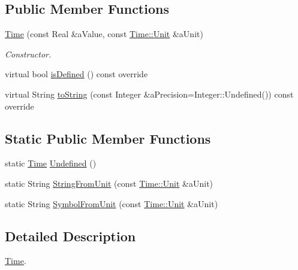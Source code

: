 \subsection*{Public Member Functions}
\begin{DoxyCompactItemize}
\item 
\hyperlink{classlibrary_1_1physics_1_1units_1_1_time_a60e2228b16ea9156a4c5ede4d7b141e5}{Time} (const Real \&a\+Value, const \hyperlink{classlibrary_1_1physics_1_1units_1_1_time_ab876a6a05c9a2f28905f2753bfd64109}{Time\+::\+Unit} \&a\+Unit)
\begin{DoxyCompactList}\small\item\em Constructor. \end{DoxyCompactList}\item 
virtual bool \hyperlink{classlibrary_1_1physics_1_1units_1_1_time_ab62163386c3253277c5ba71782261cad}{is\+Defined} () const override
\item 
virtual String \hyperlink{classlibrary_1_1physics_1_1units_1_1_time_a6f56977493a45d334bb53bc4246888c4}{to\+String} (const Integer \&a\+Precision=Integer\+::\+Undefined()) const override
\end{DoxyCompactItemize}
\subsection*{Static Public Member Functions}
\begin{DoxyCompactItemize}
\item 
static \hyperlink{classlibrary_1_1physics_1_1units_1_1_time}{Time} \hyperlink{classlibrary_1_1physics_1_1units_1_1_time_a532c992968408dcb70f5ee94e672c595}{Undefined} ()
\item 
static String \hyperlink{classlibrary_1_1physics_1_1units_1_1_time_a413c7045742e568efc2e0e2b64eb6c86}{String\+From\+Unit} (const \hyperlink{classlibrary_1_1physics_1_1units_1_1_time_ab876a6a05c9a2f28905f2753bfd64109}{Time\+::\+Unit} \&a\+Unit)
\item 
static String \hyperlink{classlibrary_1_1physics_1_1units_1_1_time_aa48f07fb50e09cd22b9b6b7a83275f39}{Symbol\+From\+Unit} (const \hyperlink{classlibrary_1_1physics_1_1units_1_1_time_ab876a6a05c9a2f28905f2753bfd64109}{Time\+::\+Unit} \&a\+Unit)
\end{DoxyCompactItemize}


\subsection{Detailed Description}
\hyperlink{classlibrary_1_1physics_1_1units_1_1_time}{Time}. 

